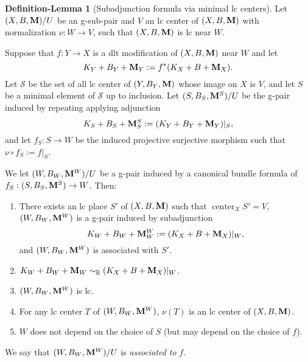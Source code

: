 \documentclass[11pt]{amsart}
\numberwithin{equation}{section}
\newcommand{\Mm}{{\bf{M}}}
\newcommand{\Center}{\operatorname{center}}
\theoremstyle{definition}
\theoremstyle{definition}
\newtheorem{deflem}[thm]{Definition-Lemma}
\theoremstyle{definition}
\begin{document}
\begin{deflem}[Subadjunction formula via minimal lc centers]\label{deflem: subadj minimal lc center}
    Let $(X,B,\Mm)/U$ be an g-sub-pair and $V$ an lc center of $(X,B,\Mm)$ with normalization $\nu: W\rightarrow V$, such that $(X,B,\Mm)$ is lc near $W$. 

    Suppose that $f: Y\rightarrow X$ is a dlt modification of $(X,B,\Mm)$ near $W$ and let
    $$K_Y+B_Y+\Mm_Y:=f^*(K_X+B+\Mm_X).$$
    Let $\mathcal{S}$ be the set of all lc center of $(Y,B_Y,\Mm)$ whose image on $X$ is $V$, and let $S$ be a minimal element of $\mathcal{S}$ up to inclusion. Let $(S,B_S,\Mm^S)/U$ be the g-pair induced by repeating applying adjunction
    $$K_S+B_S+\Mm^S_S:=(K_Y+B_Y+\Mm_Y)|_S,$$
    and let $f_S: S\rightarrow W$ be the induced projective surjective morphism such that $\nu\circ f_S:=f|_S$. 

    We let $(W,B_W,\Mm^W)/U$ be a g-pair induced by a canonical bundle formula of $f_S: (S,B_S,\Mm^S)\rightarrow W$. Then:
    \begin{enumerate}
        \item There exists an lc place $S'$ of $(X,B,\Mm)$ such that $\Center_XS'=V$, $(W,B_W,\Mm^W)$ is a g-pair induced by subadjunction
    $$K_W+B_W+\Mm^W_W:=(K_X+B+\Mm_X)|_W,$$
    and $(W,B_W,\Mm^W)$ is associated with $S'$. 
        \item $K_W+B_W+\Mm_W\sim_{\mathbb R}(K_X+B+\Mm_X)|_W$.
            \item $(W,B_W,\Mm^W)$ is lc.
            \item For any lc center $T$ of $(W,B_W,\Mm^W)$, $\nu(T)$ is an lc center of $(X,B,\Mm)$.
            \item $W$ does not depend on the choice of $S$ (but may depend on the choice of $f$).
    \end{enumerate}
    We say that $(W,B_W,\Mm^W)/U$ is \emph{associated to} $f$.
\end{deflem}
\end{document}

